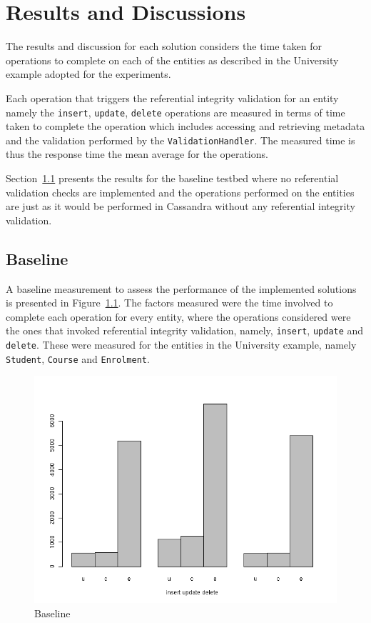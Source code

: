 \chapter{Results and Discussions}
The results and discussion for each solution considers the time taken for
operations to complete on each of the entities  as described in the University
example adopted for the experiments.

Each operation that triggers the referential integrity validation for an entity
namely the \texttt{insert}, \texttt{update}, \texttt{delete} operations are
measured in terms of time taken to complete the operation which includes
accessing and retrieving metadata  and the validation performed by the
\texttt{ValidationHandler}. The measured time is thus the response time the mean
average for the operations.

Section~\ref{sr:baseline} presents the results for the baseline testbed where no
referential validation checks are implemented and the operations performed on
the entities are just as it would be performed in Cassandra without any
referential integrity validation.


\section{Baseline}\label{sr:baseline}
A baseline measurement to assess the performance of the implemented solutions is
presented in Figure~\ref{fr:Solution0-barplot}.
The factors measured were the time involved to complete each operation for every
entity, where the operations considered were the ones that invoked referential
integrity validation, namely, \texttt{insert}, \texttt{update} and
\texttt{delete}. These were measured for the entities in the University example,
namely \texttt{Student}, \texttt{Course} and \texttt{Enrolment}.
	
\begin{figure}[h] \centering
\includegraphics[width=1\textwidth]{./figure/result/Solution0-barplot.png}
		\caption{Baseline}\label{fr:Solution0-barplot}
	\end{figure}
	
